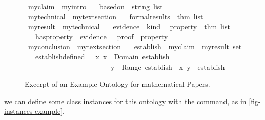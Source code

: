 \begin{isabellebody}
\begin{isamarkuptext}
\begin{figure}
\begin{isarbox}
\begin{isabelle}
\ myclaim\ {\isacharequal}{\kern0pt}\ myintro\ {\isacharplus}{\kern0pt}\isanewline
\ \ based{\isacharunderscore}{\kern0pt}on\ {\isacharcolon}{\kern0pt}{\isacharcolon}{\kern0pt}\ {\isachardoublequoteopen}string\ list{\isachardoublequoteclose}\isanewline
{}\ mytechnical\ {\isacharequal}{\kern0pt}\ mytext{\isacharunderscore}{\kern0pt}section\ {\isacharplus}{\kern0pt}\isanewline
\ \ formal{\isacharunderscore}{\kern0pt}results\ {\isacharcolon}{\kern0pt}{\isacharcolon}{\kern0pt}\ {\isachardoublequoteopen}thm\ list{\isachardoublequoteclose}\ \isanewline
{}\ myresult\ {\isacharequal}{\kern0pt}\ mytechnical\ {\isacharplus}{\kern0pt}\isanewline
\ \ evidence\ {\isacharcolon}{\kern0pt}{\isacharcolon}{\kern0pt}\ kind\isanewline
\ \ property\ {\isacharcolon}{\kern0pt}{\isacharcolon}{\kern0pt}\ {\isachardoublequoteopen}thm\ list{\isachardoublequoteclose}\ {\isacharless}{\kern0pt}{\isacharequal}{\kern0pt}\ {\isachardoublequoteopen}{\isacharbrackleft}{\kern0pt}{\isacharbrackright}{\kern0pt}{\isachardoublequoteclose}\isanewline
\ \ \ has{\isacharunderscore}{\kern0pt}property\ {\isacharcolon}{\kern0pt}{\isacharcolon}{\kern0pt}\ {\isachardoublequoteopen}evidence\ {\isasymsigma}\ {\isacharequal}{\kern0pt}\ proof\ {\isasymlongleftrightarrow}\ property\ {\isasymsigma}\ {\isasymnoteq}\ {\isacharbrackleft}{\kern0pt}{\isacharbrackright}{\kern0pt}{\isachardoublequoteclose}\isanewline
{}\ myconclusion\ {\isacharequal}{\kern0pt}\ mytext{\isacharunderscore}{\kern0pt}section\ {\isacharplus}{\kern0pt}\isanewline
\ \ establish\ {\isacharcolon}{\kern0pt}{\isacharcolon}{\kern0pt}\ {\isachardoublequoteopen}{\isacharparenleft}{\kern0pt}myclaim\ {\isasymtimes}\ myresult{\isacharparenright}{\kern0pt}\ set{\isachardoublequoteclose}\isanewline
\ \ \ establish{\isacharunderscore}{\kern0pt}defined\ {\isacharcolon}{\kern0pt}{\isacharcolon}{\kern0pt}\ {\isachardoublequoteopen}{\isasymforall}\ x{\isachardot}{\kern0pt}\ x\ {\isasymin}\ Domain\ {\isacharparenleft}{\kern0pt}establish\ {\isasymsigma}{\isacharparenright}{\kern0pt}\isanewline
\ \ \ \ \ \ \ \ \ \ \ \ \ \ \ \ \ \ \ \ \ \ {\isasymlongrightarrow}\ {\isacharparenleft}{\kern0pt}{\isasymexists}\ y\ {\isasymin}\ Range\ {\isacharparenleft}{\kern0pt}establish\ {\isasymsigma}{\isacharparenright}{\kern0pt}{\isachardot}{\kern0pt}\ {\isacharparenleft}{\kern0pt}x{\isacharcomma}{\kern0pt}\ y{\isacharparenright}{\kern0pt}\ {\isasymin}\ establish\ {\isasymsigma}{\isacharparenright}{\kern0pt}{\isachardoublequoteclose}
\end{isabelle}
\end{isarbox}
\caption{Excerpt of an Example Ontology for mathematical Papers.}
\label{fig-ontology-example}
\end{figure}
  we can define some class instances for this ontology with the  command,
  as in \autoref{fig-instances-example}.
\begin{figure}


\end{figure}
\end{isamarkuptext}
\end{isabellebody}
